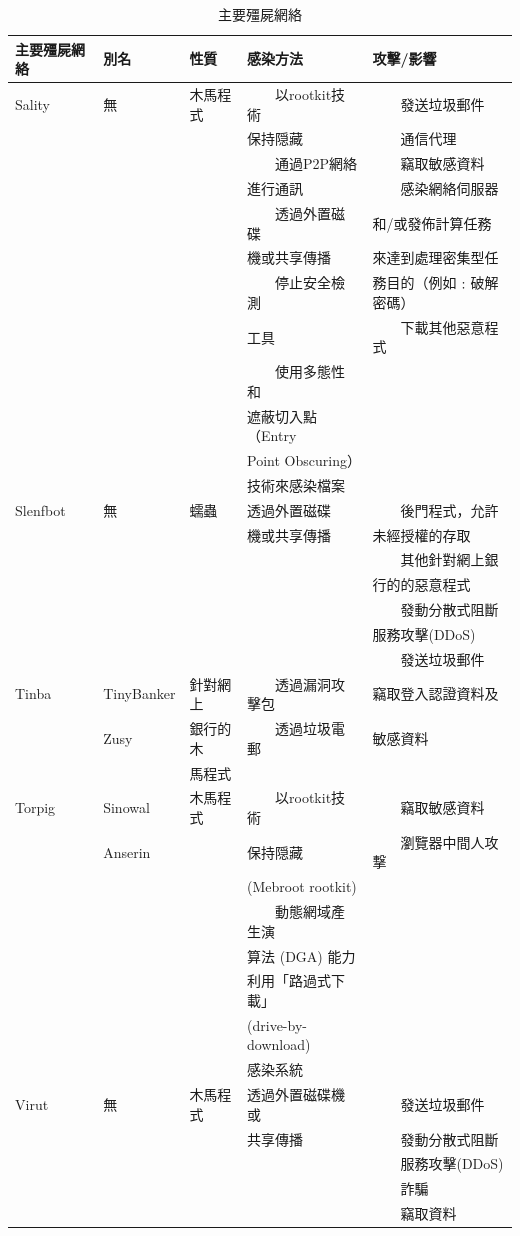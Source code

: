 \documentclass[14pt]{extarticle}
\newcommand{\tabitem}{~~\llap{\textbullet}~~}
\begin{document}
\begin{table}[!htbp]
\centering
\caption{主要殭屍網絡}
\begin{tabular}{lllll} \hline
\bf 主要殭屍網絡 & \bf 別名 & \bf 性質 & \bf 感染方法 & \bf 攻擊/影響\\\hline
Sality & 無 & 	木馬程式	& \tabitem 以rootkit技術 & \tabitem 發送垃圾郵件 \\
&&& 保持隠藏 & \tabitem 通信代理 \\	
&&& \tabitem 通過P2P網絡 & \tabitem 竊取敏感資料 \\
&&& 進行通訊 & \tabitem 感染網絡伺服器 \\
&&& \tabitem 透過外置磁碟 & 和/或發佈計算任務 \\
&&& 機或共享傳播 & 來達到處理密集型任 \\ 
&&&	\tabitem 停止安全檢測 &務目的（例如﹕破解密碼）\\
&&& 工具 & \tabitem 下載其他惡意程式 \\
&&&	\tabitem 使用多態性和\\
&&& 遮蔽切入點（Entry \\
&&& Point Obscuring）\\
&&& 技術來感染檔案 \\\hline
Slenfbot &	無 &	蠕蟲	& 透過外置磁碟 & \tabitem 後門程式，允許 \\
 &&& 機或共享傳播 &未經授權的存取\\
  &&&& \tabitem 其他針對網上銀\\
  &&&& 行的的惡意程式\\
&&&& \tabitem 發動分散式阻斷 \\
&&&& 服務攻擊(DDoS) \\
&&&& \tabitem 發送垃圾郵件 \\\hline
Tinba	&	TinyBanker & 針對網上 & \tabitem 透過漏洞攻擊包 & 竊取登入認證資料及 \\
&	Zusy& 	銀行的木 & \tabitem 透過垃圾電郵 & 敏感資料 \\
& & 馬程式 \\\hline
Torpig	&	Sinowal &木馬程式 & \tabitem 以rootkit技術 & \tabitem 竊取敏感資料 \\
& Anserin	& & 保持隠藏 & \tabitem 瀏覽器中間人攻撃 \\
& & & (Mebroot rootkit)\\
& & & \tabitem 動態網域產生演 \\
& & & 算法 (DGA) 能力\\
&&& 利用「路過式下載」\\
&&& (drive-by-download) \\
&&& 感染系統	\\\hline
Virut & 無	& 木馬程式	& 透過外置磁碟機或 & \tabitem 發送垃圾郵件 \\
 &&& 共享傳播 & \tabitem 發動分散式阻斷 \\
&&&& \tabitem 服務攻擊(DDoS) \\
&&&& \tabitem	詐騙 \\
&&&& \tabitem 竊取資料 \\\hline	


\end{tabular}
\end{table}
\end{document}

